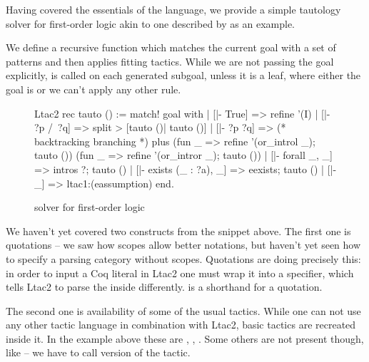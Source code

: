 Having covered the essentials of the language, we provide a simple tautology solver for first-order logic akin to one described by \citet{zilianiMtacMonadTyped2013} as an example.

We define a recursive function  which matches the current goal with a set of patterns and then applies fitting tactics.
While we are not passing the goal explicitly,  is called on each generated subgoal, unless it is a leaf, where either the goal is  or we can't apply any other rule.

\begin{figure}[H]
  \begin{coq}
  Ltac2 rec tauto () :=
  match! goal with
  | [|- True] =>
   refine '(I)
  | [|- ?p /\ ?q] =>
    split > [tauto ()| tauto ()]
  | [|- ?p \/ ?q] =>
    (* backtracking branching *)
    plus (fun _ => refine '(or_introl _); tauto ())
         (fun _ => refine '(or_intror _); tauto ())
  | [|- forall _, _] =>
    intros ?; tauto ()
  | [|- exists (_ : ?a), _] =>
    eexists; tauto ()
  | [|- _] => ltac1:(eassumption)
  end.
  \end{coq}
  \caption{solver for first-order logic}
  \label{fig:ltac2-solver}
\end{figure}

We haven't yet covered two constructs from the snippet above.
The first one is quotations -- we saw how scopes allow better notations, but haven't yet seen how to specify a parsing category without scopes.
Quotations are doing precisely this: in order to input a Coq literal  in Ltac2 one must wrap it into a  specifier, which tells Ltac2 to parse the inside differently.
 is a shorthand for a  quotation.

The second one is availability of some of the usual tactics.
While one can not use any other tactic language in combination with Ltac2, basic tactics are recreated inside it.
In the example above these are , , .
Some others are not present though, like  -- we have to call  version of the tactic.



